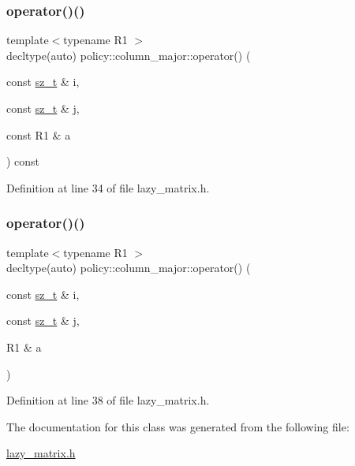 \subsubsection{\texorpdfstring{operator()()}{operator()()}\hspace{0.1cm}{\footnotesize\ttfamily [1/2]}}
{\footnotesize\ttfamily template$<$typename R1 $>$ \\
decltype(auto) policy\+::column\+\_\+major\+::operator() (\begin{DoxyParamCaption}\item[{const \mbox{\hyperlink{lazy__matrix_8h_acba2745dcfc55b2d05ff45adc6a0a015}{sz\+\_\+t}} \&}]{i,  }\item[{const \mbox{\hyperlink{lazy__matrix_8h_acba2745dcfc55b2d05ff45adc6a0a015}{sz\+\_\+t}} \&}]{j,  }\item[{const R1 \&}]{a }\end{DoxyParamCaption}) const\hspace{0.3cm}{\ttfamily [inline]}}



Definition at line 34 of file lazy\+\_\+matrix.\+h.

\mbox{\label{classpolicy_1_1column__major_a3f273113d234f459e1723679d2064127}} 
\subsubsection{\texorpdfstring{operator()()}{operator()()}\hspace{0.1cm}{\footnotesize\ttfamily [2/2]}}
{\footnotesize\ttfamily template$<$typename R1 $>$ \\
decltype(auto) policy\+::column\+\_\+major\+::operator() (\begin{DoxyParamCaption}\item[{const \mbox{\hyperlink{lazy__matrix_8h_acba2745dcfc55b2d05ff45adc6a0a015}{sz\+\_\+t}} \&}]{i,  }\item[{const \mbox{\hyperlink{lazy__matrix_8h_acba2745dcfc55b2d05ff45adc6a0a015}{sz\+\_\+t}} \&}]{j,  }\item[{R1 \&}]{a }\end{DoxyParamCaption})\hspace{0.3cm}{\ttfamily [inline]}}



Definition at line 38 of file lazy\+\_\+matrix.\+h.



The documentation for this class was generated from the following file\+:\begin{DoxyCompactItemize}
\item 
\mbox{\hyperlink{lazy__matrix_8h}{lazy\+\_\+matrix.\+h}}\end{DoxyCompactItemize}
